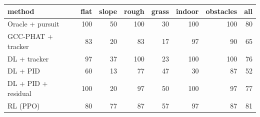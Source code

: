 \begin{tabular}{lrrrrrrr}
\toprule
method & flat & slope & rough & grass & indoor & obstacles & all\\
\midrule
Oracle + pursuit & 100 & 50 & 100 & 30 & 100 & 100 & 80 \\
GCC-PHAT + tracker & 83 & 20 & 83 & 17 & 97 & 90 & 65 \\
DL + tracker & 97 & 37 & 100 & 23 & 100 & 100 & 76 \\
DL + PID & 60 & 13 & 77 & 47 & 30 & 87 & 52 \\
DL + PID + residual & 100 & 20 & 97 & 50 & 100 & 97 & 77 \\
RL (PPO) & 80 & 77 & 87 & 57 & 97 & 87 & 81 \\
\bottomrule
\end{tabular}
